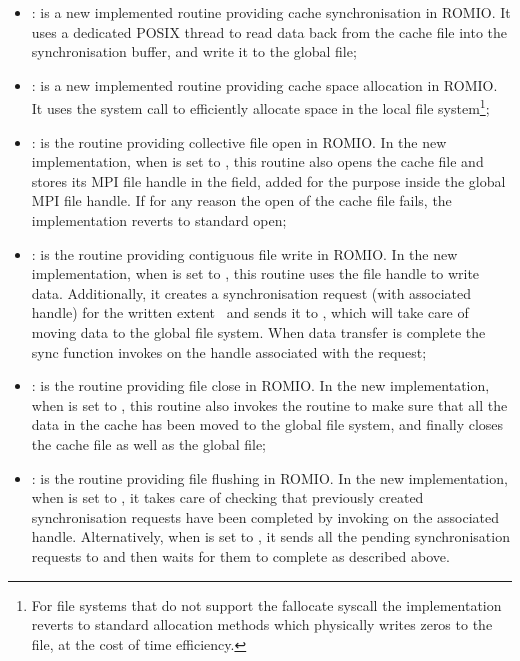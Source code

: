 \begin{itemize}
        \item {}: is a new implemented routine providing cache synchronisation in ROMIO. It uses a dedicated POSIX thread to read data back from the cache file into the synchronisation buffer, and write it to the global file;
        \item {}: is a new implemented routine providing cache space allocation in ROMIO. It uses the  system call to efficiently allocate space in the local file system\footnote{For file systems that do not support the fallocate syscall the implementation reverts to standard allocation methods which physically writes zeros to the file, at the cost of time efficiency.};
        \item {}: is the routine providing collective file open in ROMIO. In the new implementation, when  is set to , this routine also opens the cache file and stores its MPI file handle in the  field, added for the purpose inside the global MPI file handle. If for any reason the open of the cache file fails, the implementation reverts to standard open;
        \item {}: is the routine providing contiguous file write in ROMIO. In the new implementation, when  is set to , this routine uses the  file handle to write data. Additionally, it creates a synchronisation request (with associated  handle) for the written extent~\cite{mpispecs} and sends it to , which will take care of moving data to the global file system. When data transfer is complete the sync function invokes  on the  handle associated with the request;
        \item {}: is the routine providing file close in ROMIO. In the new implementation, when  is set to , this routine also invokes the  routine to make sure that all the data in the cache has been moved to the global file system, and finally closes the cache file as well as the global file;
        \item {}: is the routine providing file flushing in ROMIO. In the new implementation, when  is set to , it takes care of checking that previously created synchronisation requests have been completed by invoking  on the associated  handle. Alternatively, when  is set to , it sends all the pending synchronisation requests to  and then waits for them to complete as described above.
\end{itemize}

